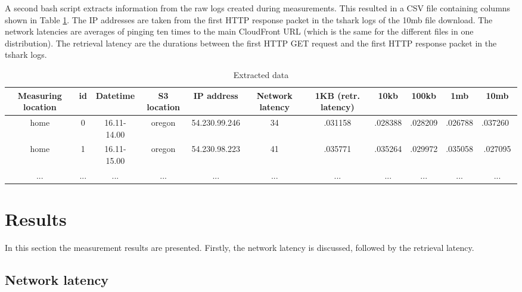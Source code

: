 \documentclass[conference]{IEEEtran}
\begin{document}

A second bash script extracts information from the raw logs created during measurements. This resulted in a CSV file containing columns shown in Table \ref{table:extracteddata}. The IP addresses are taken from the first HTTP response packet in the tshark logs of the 10mb file download. The network latencies are averages of pinging ten times to the main CloudFront URL (which is the same for the different files in one distribution). The retrieval latency are the durations between the first HTTP GET request and the first HTTP response packet in the tshark logs.

\begin{table}
\renewcommand{\arraystretch}{1.3}
\caption{Extracted data}
\centering
\begin{tabular}{|c|c|c|c|c|c|c|c|c|c|c|}
\hline
\bfseries Measuring location & \bfseries id & \bfseries Datetime & \bfseries S3 location & \bfseries IP address & \bfseries Network latency & \bfseries 1KB (retr. latency) & \bfseries 10kb & \bfseries 100kb & \bfseries 1mb & \bfseries 10mb \\
\hline\hline
home & 0 & 16.11-14.00 & oregon & 54.230.99.246 & 34 & .031158 & .028388 & .028209 & .026788 & .037260 \\
\hline
home & 1 & 16.11-15.00 & oregon & 54.230.98.223 & 41 & .035771 & .035264 & .029972 & .035058 & .027095 \\
\hline
... & ... & ... & ... & ... & ... & ... & ... & ... & ... & ... \\
\hline
\end{tabular}
\label{table:extracteddata}
\end{table}


\section{Results}
In this section the measurement results are presented. Firstly, the network latency is discussed, followed by the retrieval latency.

\subsection{Network latency}
\end{document}
